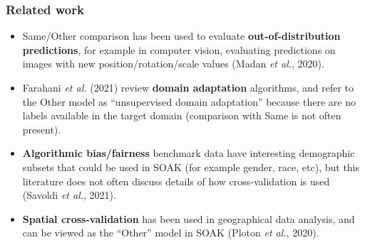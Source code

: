 \documentclass[t]{beamer}
\begin{document}

   



\begin{frame}
  \frametitle{Related work}
  \begin{itemize}
  \item Same/Other comparison has been used to evaluate
    \textbf{out-of-distribution predictions}, for example in computer vision,
    evaluating predictions on images with new position/rotation/scale
    values (Madan \emph{et al.}, 2020).
  \item Farahani \emph{et al.} (2021) review \textbf{domain adaptation}
    algorithms, and refer to the Other model as ``unsupervised domain
    adaptation'' because there are no labels available in the target
    domain (comparison with Same is not often present).
  \item \textbf{Algorithmic bias/fairness} benchmark data have interesting
    demographic subsets that could be used in SOAK (for example
    gender, race, etc), but this literature does not often discuss
    details of how cross-validation is used (Savoldi \emph{et al.}, 2021).
  \item \textbf{Spatial cross-validation} has been used in geographical
    data analysis, and can be viewed as the ``Other'' model in SOAK
    (Ploton \emph{et al.}, 2020).
  \end{itemize}
\end{frame}
\end{document}
